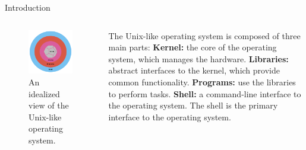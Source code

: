 \documentclass[aspectratio=169]{beamer}
\begin{document}
    \begin{frame}{Introduction}
        \begin{columns}
            \begin{column}{0.5\linewidth}
                \begin{figure}[H]
                    \centering
                    \includegraphics[width=0.7\linewidth]{kernel.png}
                    \caption{An idealized view of the Unix-like operating system.}
                \end{figure}
            \end{column}
            \begin{column}{0.5\linewidth}
                \begin{outline}
                    \1 The Unix-like operating system is composed of three main parts:
                        \2 \textbf{Kernel:} the core of the operating system, which manages the hardware.
                        \2 \textbf{Libraries:} abstract interfaces to the kernel, which provide common functionality.
                        \2 \textbf{Programs:} use the libraries to perform tasks.
                        \2 \textbf{Shell:} a command-line interface to the operating system. 
                    \1 The shell is the primary interface to the operating system.
                \end{outline}
            \end{column}
        \end{columns}
    \end{frame}
\end{document}
